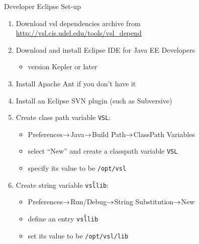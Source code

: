 \documentclass[t]{beamer}
\begin{document}
\begin{frame}{Developer Eclipse Set-up}
  \begin{enumerate}
  \item Download vsl dependencies archive from
    \url{http://vsl.cis.udel.edu/tools/vsl_depend}
  \item Download and install Eclipse IDE for Java EE Developers
    \begin{itemize}
    \item version Kepler or later
    \end{itemize}
  \item Install Apache Ant if you don't have it
  \item Install an Eclipse SVN plugin (such as Subversive)
  \item Create class path variable \texttt{VSL}:
    \begin{itemize}
    \item Preferences$\rightarrow$Java$\rightarrow$Build Path$\rightarrow$ClassPath Variables
    \item select ``New'' and create a classpath variable \texttt{VSL}
    \item specify its value to be \texttt{/opt/vsl}
    \end{itemize}
  \item Create string variable \texttt{vsl{\U}lib}:
    \begin{itemize}
    \item Preferences$\rightarrow$Run/Debug$\rightarrow$String Substitution$\rightarrow$New
    \item define an entry \texttt{vsl{\U}lib}
    \item set its value to be \texttt{/opt/vsl/lib}
    \end{itemize}
  \end{enumerate}
\end{frame}
\end{document}
